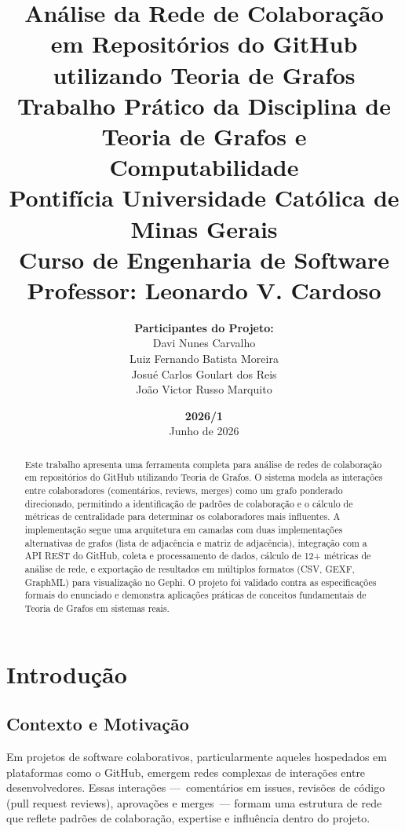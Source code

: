 \documentclass[12pt,a4paper]{article}
\title{%
  \textbf{\Large Análise da Rede de Colaboração em Repositórios do GitHub}\\[0.5cm]
  \textbf{\large utilizando Teoria de Grafos}\\[1cm]
  \normalsize Trabalho Prático da Disciplina de Teoria de Grafos e Computabilidade\\[0.3cm]
  \normalsize Pontifícia Universidade Católica de Minas Gerais\\[0.3cm]
  \normalsize Curso de Engenharia de Software\\[0.3cm]
  \normalsize Professor: Leonardo V. Cardoso\\[0.5cm]
}
\author{%
  \textbf{Participantes do Projeto:}\\[0.3cm]
  Davi Nunes Carvalho\\[0.2cm]
  Luiz Fernando Batista Moreira\\[0.2cm]
  Josué Carlos Goulart dos Reis\\[0.2cm]
  João Victor Russo Marquito%
}
\date{%
  \vspace{0.5cm}
  \textbf{2026/1}\\[0.3cm]
  Junho de 2026%
}
\begin{document}
\maketitle

\begin{abstract}
  Este trabalho apresenta uma ferramenta completa para análise de redes de colaboração em repositórios do GitHub utilizando Teoria de Grafos. O sistema modela as interações entre colaboradores (comentários, reviews, merges) como um grafo ponderado direcionado, permitindo a identificação de padrões de colaboração e o cálculo de métricas de centralidade para determinar os colaboradores mais influentes. A implementação segue uma arquitetura em camadas com duas implementações alternativas de grafos (lista de adjacência e matriz de adjacência), integração com a API REST do GitHub, coleta e processamento de dados, cálculo de 12+ métricas de análise de rede, e exportação de resultados em múltiplos formatos (CSV, GEXF, GraphML) para visualização no Gephi. O projeto foi validado contra as especificações formais do enunciado e demonstra aplicações práticas de conceitos fundamentais de Teoria de Grafos em sistemas reais.
\end{abstract}

\newpage

{\small
\tableofcontents
}
\newpage

\section{Introdução}\label{sec:intro}

\subsection{Contexto e Motivação}

Em projetos de software colaborativos, particularmente aqueles hospedados em plataformas como o GitHub, emergem redes complexas de interações entre desenvolvedores. Essas interações —~comentários em issues, revisões de código (pull request reviews), aprovações e merges~— formam uma estrutura de rede que reflete padrões de colaboração, expertise e influência dentro do projeto.
\end{document}
